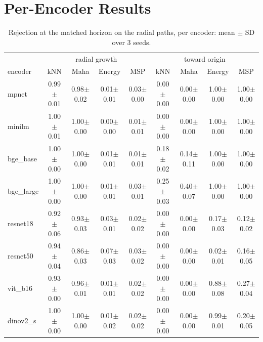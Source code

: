 \documentclass[twoside]{article}
\theoremstyle{definition}
\theoremstyle{remark}
\begin{document}
\section{Per-Encoder Results}\label{app:perencoder}
\begin{table}[!htbp]
\centering
\scriptsize
\caption{Rejection at the matched horizon on the radial paths, per encoder: mean $\pm$ SD over 3 seeds.}
\label{tab:perencoder}
\begin{tabular}{l cccc cccc}
\toprule
 & \multicolumn{4}{c}{radial growth} & \multicolumn{4}{c}{toward origin} \\
encoder & kNN & Maha & Energy & MSP & kNN & Maha & Energy & MSP \\
\midrule
mpnet & 0.99$\pm$0.01 & 0.98$\pm$0.02 & 0.01$\pm$0.01 & 0.03$\pm$0.00 & 0.00$\pm$0.00 & 0.00$\pm$0.00 & 1.00$\pm$0.00 & 1.00$\pm$0.00 \\
minilm & 1.00$\pm$0.01 & 1.00$\pm$0.00 & 0.00$\pm$0.00 & 0.01$\pm$0.01 & 0.00$\pm$0.00 & 0.00$\pm$0.00 & 1.00$\pm$0.00 & 1.00$\pm$0.00 \\
bge\_base & 1.00$\pm$0.00 & 1.00$\pm$0.00 & 0.01$\pm$0.01 & 0.01$\pm$0.01 & 0.18$\pm$0.02 & 0.14$\pm$0.11 & 1.00$\pm$0.00 & 1.00$\pm$0.00 \\
bge\_large & 1.00$\pm$0.00 & 1.00$\pm$0.00 & 0.01$\pm$0.01 & 0.03$\pm$0.01 & 0.25$\pm$0.03 & 0.40$\pm$0.07 & 1.00$\pm$0.00 & 1.00$\pm$0.00 \\
resnet18 & 0.92$\pm$0.06 & 0.93$\pm$0.03 & 0.03$\pm$0.01 & 0.02$\pm$0.02 & 0.00$\pm$0.00 & 0.00$\pm$0.00 & 0.17$\pm$0.03 & 0.12$\pm$0.02 \\
resnet50 & 0.94$\pm$0.04 & 0.86$\pm$0.03 & 0.07$\pm$0.03 & 0.03$\pm$0.02 & 0.00$\pm$0.00 & 0.00$\pm$0.00 & 0.02$\pm$0.01 & 0.16$\pm$0.05 \\
vit\_b16 & 0.93$\pm$0.00 & 0.96$\pm$0.01 & 0.01$\pm$0.01 & 0.02$\pm$0.02 & 0.00$\pm$0.00 & 0.00$\pm$0.00 & 0.88$\pm$0.08 & 0.27$\pm$0.04 \\
dinov2\_s & 1.00$\pm$0.00 & 1.00$\pm$0.00 & 0.01$\pm$0.02 & 0.02$\pm$0.02 & 0.00$\pm$0.00 & 0.00$\pm$0.00 & 0.99$\pm$0.01 & 0.20$\pm$0.05 \\
\bottomrule
\end{tabular}
\end{table}
\end{document}
